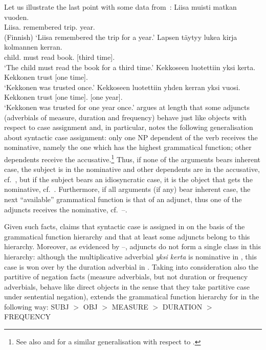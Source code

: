 \documentclass[output=paper,biblatex,babelshorthands,newtxmath,draftmode,colorlinks,citecolor=brown]{langscibook}
\begin{document}
\largerpage[2]
Let us illustrate the last point with some  data from~\citet[, 59]{mali:93}:
\eal
\ex 
\label{subj}
\gll Liisa muisti matkan vuoden. \\
     Liisa.\NOM{} remembered trip.\ACC{} year.\ACC{}\\\hfill(Finnish)
\glt  `Liisa remembered the trip for a year.'
\ex
\label{adv1bis}\label{obj}
\gll Lapsen täytyy lukea kirja \phtm{[}kolmannen kerran. \\
    child.\GEN{} must read book.\NOM{} [third time].\ACC{}\\
\glt  `The child must read the book for a third time.'
\ex
\label{adv1}
\gll Kekkoseen luotettiin \phtm{[}yksi kerta. \\
     Kekkonen\Ill{} trust\PassP{} [one time].\NOM{}\\
\glt `Kekkonen was trusted once.'
\ex
\label{adv2}
\gll Kekkoseen      luotettiin    \phtm{[}yhden kerran \phtm{[}yksi vuosi. \\
     Kekkonen\Ill{} trust\PassP{} [one time].\ACC{}    [one year].\NOM{}\\
\glt `Kekkonen was trusted for one year once.'
\zl
\citet{mali:93} argues at length that some adjuncts (adverbials of measure,
duration and frequency) behave just like objects with respect to case
assignment and, in particular, notes the following generalisation about
syntactic case assignment: only one NP dependent of the verb receives the
nominative, namely the one which has the highest grammatical function;
other dependents receive the accusative.\footnote{See also
  \citet{zae:mal:83} and \citet{ZMT85a} for a similar generalisation with respect to
  .}  Thus, if none of the arguments bears inherent case, the
subject is in the nominative and other dependents are in the accusative, cf.~, but if the subject bears an idiosyncratic case, it is the
object that gets the nominative, cf.~.  Furthermore, if all arguments
(if any) bear inherent case, the next “available” grammatical function is
that of an adjunct, thus one of the adjuncts receives the nominative, 
cf.~–.

Given such facts,
\citet{mali:93} claims that syntactic case is assigned in  on
the basis of the grammatical function hierarchy and that at least some adjuncts
belong to this hierarchy.  Moreover, as evidenced by
–, adjuncts do not form a single class in this
hierarchy: although the multiplicative adverbial \emph{yksi kerta} is
nominative in , this case is won over by the duration
adverbial in . Taking into consideration also the partitive
of negation facts (measure adverbials, but not duration or frequency
adverbials, behave like direct objects in the sense that they take
partitive case under sentential negation), \citet{mali:93} extends the
grammatical function hierarchy for  in the following way:
\eal
SUBJ $>$ OBJ $>$ MEASURE $>$ DURATION $>$ FREQUENCY
\zl
\end{document}
